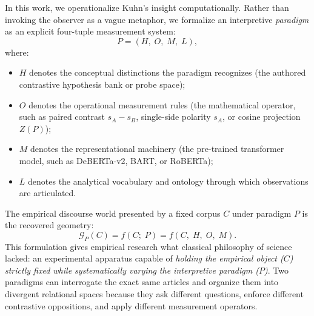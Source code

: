 In this work, we operationalize Kuhn's insight computationally. Rather than invoking the observer as a vague metaphor, we formalize an interpretive \emph{paradigm} as an explicit four-tuple measurement system:
\begin{equation}
    P = (H,\; O,\; M,\; L),
\end{equation}
where:
\begin{itemize}
    \item $H$ denotes the conceptual distinctions the paradigm recognizes (the authored contrastive hypothesis bank or probe space);
    \item $O$ denotes the operational measurement rules (the mathematical operator, such as paired contrast $s_A - s_B$, single-side polarity $s_A$, or cosine projection $Z(P)$);
    \item $M$ denotes the representational machinery (the pre-trained transformer model, such as DeBERTa-v2, BART, or RoBERTa);
    \item $L$ denotes the analytical vocabulary and ontology through which observations are articulated.
\end{itemize}
The empirical discourse world presented by a fixed corpus $C$ under paradigm $P$ is the recovered geometry:
\begin{equation}
    \mathcal{G}_P(C) = f(C;\; P) = f(C,\; H,\; O,\; M).
\end{equation}
This formulation gives empirical research what classical philosophy of science lacked: an experimental apparatus capable of \emph{holding the empirical object ($C$) strictly fixed while systematically varying the interpretive paradigm ($P$)}. Two paradigms can interrogate the exact same articles and organize them into divergent relational spaces because they ask different questions, enforce different contrastive oppositions, and apply different measurement operators.

